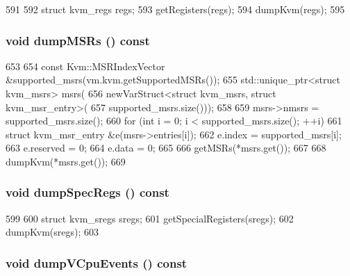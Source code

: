 \begin{DoxyCode}
591 {
592     struct kvm_regs regs;
593     getRegisters(regs);
594     dumpKvm(regs);
595 }
\end{DoxyCode}
\hypertarget{classX86KvmCPU_ad68abbbf4ef33ea6b6ed643fee2c13e6}{
\subsubsection[{dumpMSRs}]{\setlength{\rightskip}{0pt plus 5cm}void dumpMSRs () const}}
\label{classX86KvmCPU_ad68abbbf4ef33ea6b6ed643fee2c13e6}



\begin{DoxyCode}
653 {
654     const Kvm::MSRIndexVector &supported_msrs(vm.kvm.getSupportedMSRs());
655     std::unique_ptr<struct kvm_msrs> msrs(
656         newVarStruct<struct kvm_msrs, struct kvm_msr_entry>(
657             supported_msrs.size()));
658 
659     msrs->nmsrs = supported_msrs.size();
660     for (int i = 0; i < supported_msrs.size(); ++i) {
661         struct kvm_msr_entry &e(msrs->entries[i]);
662         e.index = supported_msrs[i];
663         e.reserved = 0;
664         e.data = 0;
665     }
666     getMSRs(*msrs.get());
667 
668     dumpKvm(*msrs.get());
669 }
\end{DoxyCode}
\hypertarget{classX86KvmCPU_a8a8d697d582ced238ec0dfca97be2a75}{
\subsubsection[{dumpSpecRegs}]{\setlength{\rightskip}{0pt plus 5cm}void dumpSpecRegs () const}}
\label{classX86KvmCPU_a8a8d697d582ced238ec0dfca97be2a75}



\begin{DoxyCode}
599 {
600     struct kvm_sregs sregs;
601     getSpecialRegisters(sregs);
602     dumpKvm(sregs);
603 }
\end{DoxyCode}
\hypertarget{classX86KvmCPU_ab17603ee90366735647c3ed5407e23ec}{
\subsubsection[{dumpVCpuEvents}]{\setlength{\rightskip}{0pt plus 5cm}void dumpVCpuEvents () const}}
\label{classX86KvmCPU_ab17603ee90366735647c3ed5407e23ec}



